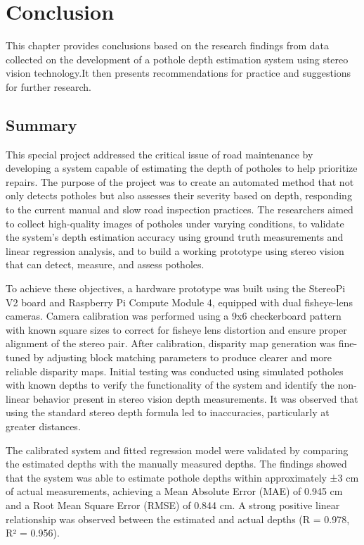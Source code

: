 \chapter{Conclusion}
This chapter provides conclusions based on the research findings from data collected on the development of a pothole depth estimation system using stereo vision technology.It then presents recommendations for practice and suggestions for further research.

\section{Summary}
This special project addressed the critical issue of road maintenance by developing a system capable of estimating the depth of potholes to help prioritize repairs. The purpose of the project was to create an automated method that not only detects potholes but also assesses their severity based on depth, responding to the current manual and slow road inspection practices. The researchers aimed to collect high-quality images of potholes under varying conditions, to validate the system’s depth estimation accuracy using ground truth measurements and linear regression analysis, and to build a working prototype using stereo vision that can detect, measure, and assess potholes. 

To achieve these objectives, a hardware prototype was built using the StereoPi V2 board and Raspberry Pi Compute Module 4, equipped with dual fisheye-lens cameras. Camera calibration was performed using a 9x6 checkerboard pattern with known square sizes to correct for fisheye lens distortion and ensure proper alignment of the stereo pair. After calibration, disparity map generation was fine-tuned by adjusting block matching parameters to produce clearer and more reliable disparity maps. Initial testing was conducted using simulated potholes with known depths to verify the functionality of the system and identify the non-linear behavior present in stereo vision depth measurements. It was observed that using the standard stereo depth formula led to inaccuracies, particularly at greater distances. 

The calibrated system and fitted regression model were validated by comparing the estimated depths with the manually measured depths. The findings showed that the system was able to estimate pothole depths within approximately ±3 cm of actual measurements, achieving a Mean Absolute Error (MAE) of 0.945 cm and a Root Mean Square Error (RMSE) of 0.844 cm. A strong positive linear relationship was observed between the estimated and actual depths (R = 0.978, R² = 0.956).

